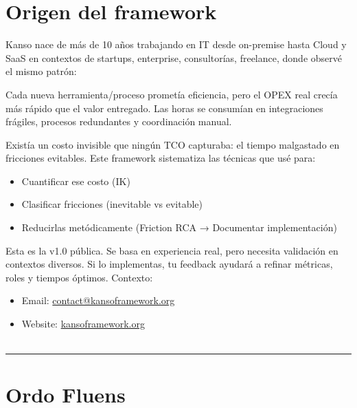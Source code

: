 \section{Origen del framework}

Kanso nace de más de 10 años trabajando en IT desde on-premise hasta Cloud y SaaS en contextos de startups, 
enterprise, consultorías, freelance, donde observé el mismo patrón:

Cada nueva herramienta/proceso prometía eficiencia, pero el OPEX real crecía más rápido que el valor entregado. 
Las horas se consumían en integraciones frágiles, procesos redundantes y coordinación manual.

Existía un costo invisible que ningún TCO capturaba: el tiempo malgastado en fricciones evitables. 
Este framework sistematiza las técnicas que usé para:
\begin{itemize}
    \item Cuantificar ese costo (IK)
    \item Clasificar fricciones (inevitable vs evitable)
    \item Reducirlas metódicamente (Friction RCA → Documentar implementación)
\end{itemize}

Esta es la v1.0 pública. Se basa en experiencia real, pero necesita validación en contextos diversos. 
Si lo implementas, tu feedback ayudará a refinar métricas, roles y tiempos óptimos. Contexto:
\begin{itemize}
    \item Email: \href{mailto:contact@kansoframework.org}{contact@kansoframework.org}
    \item Website: \href{kansoframework.org}{kansoframework.org}
\\
\\
\end{itemize}

\hrule
\section{Ordo Fluens}

